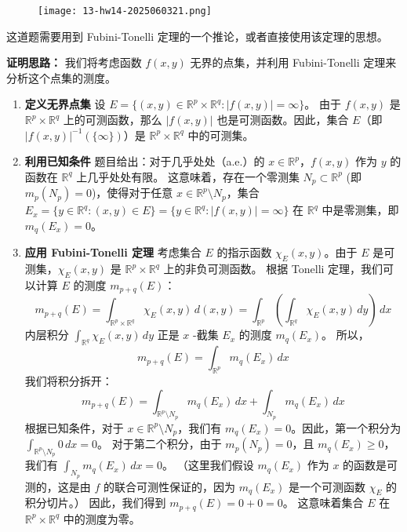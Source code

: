 \begin{exercise}
\begin{figure}[H]
\centering
\texttt{[image: 13-hw14-2025060321.png]}
\label{}
\end{figure}
\end{exercise}
这道题需要用到 Fubini-Tonelli 定理的一个推论，或者直接使用该定理的思想。

\textbf{证明思路：}
我们将考虑函数 $f(x,y)$ 无界的点集，并利用 Fubini-Tonelli 定理来分析这个点集的测度。

\begin{enumerate}
	\item \textbf{定义无界点集}
设 $E = \{ (x,y) \in \mathbb{R}^p \times \mathbb{R}^q : |f(x,y)| = \infty \}$。
由于 $f(x,y)$ 是 $\mathbb{R}^p \times \mathbb{R}^q$ 上的可测函数，那么 $|f(x,y)|$ 也是可测函数。因此，集合 $E$（即 $|f(x,y)|^{-1}(\{\infty\})$）是 $\mathbb{R}^p \times \mathbb{R}^q$ 中的可测集。
	\item \textbf{利用已知条件}
题目给出：对于几乎处处（a.e.）的 $x \in \mathbb{R}^p$，$f(x,y)$ 作为 $y$ 的函数在 $\mathbb{R}^q$ 上几乎处处有限。
这意味着，存在一个零测集 $N_p \subset \mathbb{R}^p$ (即 $m_p(N_p) = 0$)，使得对于任意 $x \in \mathbb{R}^p \setminus N_p$，集合
$E_x = \{ y \in \mathbb{R}^q : (x,y) \in E \} = \{ y \in \mathbb{R}^q : |f(x,y)| = \infty \}$
在 $\mathbb{R}^q$ 中是零测集，即 $m_q(E_x) = 0$。
	\item \textbf{应用 Fubini-Tonelli 定理}
考虑集合 $E$ 的指示函数 $\chi_E(x,y)$。由于 $E$ 是可测集，$\chi_E(x,y)$ 是 $\mathbb{R}^p \times \mathbb{R}^q$ 上的非负可测函数。
根据 Tonelli 定理，我们可以计算 $E$ 的测度 $m_{p+q}(E)$：
\[
m_{p+q}(E) = \int_{\mathbb{R}^p \times \mathbb{R}^q} \chi_E(x,y) \,d(x,y) = \int_{\mathbb{R}^p} \left( \int_{\mathbb{R}^q} \chi_E(x,y) \,dy \right) \,dx
\]内层积分 $\int_{\mathbb{R}^q} \chi_E(x,y) \,dy$ 正是 $x$ -截集 $E_x$ 的测度 $m_q(E_x)$。
所以，
\[
m_{p+q}(E) = \int_{\mathbb{R}^p} m_q(E_x) \,dx
\]我们将积分拆开：
\[
m_{p+q}(E) = \int_{\mathbb{R}^p \setminus N_p} m_q(E_x) \,dx + \int_{N_p} m_q(E_x) \,dx
\]根据已知条件，对于 $x \in \mathbb{R}^p \setminus N_p$，我们有 $m_q(E_x) = 0$。因此，第一个积分为 $\int_{\mathbb{R}^p \setminus N_p} 0 \,dx = 0$。
对于第二个积分，由于 $m_p(N_p) = 0$，且 $m_q(E_x) \ge 0$，我们有 $\int_{N_p} m_q(E_x) \,dx = 0$。
（这里我们假设 $m_q(E_x)$ 作为 $x$ 的函数是可测的，这是由 $f$ 的联合可测性保证的，因为 $m_q(E_x)$ 是一个可测函数 $\chi_E$ 的积分切片。）
因此，我们得到 $m_{p+q}(E) = 0 + 0 = 0$。
这意味着集合 $E$ 在 $\mathbb{R}^p \times \mathbb{R}^q$ 中的测度为零。

\end{enumerate}
